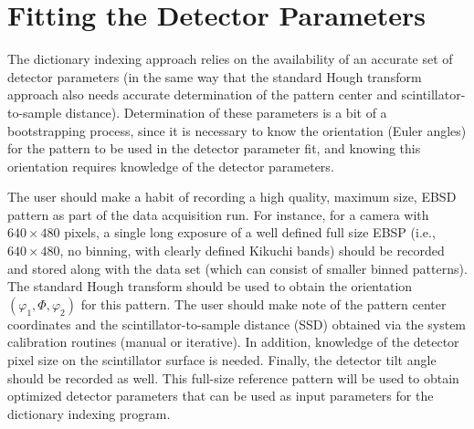 \documentclass[DIV=calc, paper=letter, fontsize=11pt]{scrartcl}	 %
\begin{document}
\section{Fitting the Detector Parameters\label{sec:fit}}
The dictionary indexing approach relies on the availability of an accurate set of detector parameters (in the same way that the 
standard Hough transform approach also needs accurate determination of the pattern center and scintillator-to-sample distance).  
Determination of these parameters is a bit of a bootstrapping process, since it is necessary to know the orientation (Euler angles)
for the pattern to be used in the detector parameter fit, and knowing this orientation requires knowledge of the detector parameters.

The user should make a habit of recording a high quality, maximum size, EBSD pattern as part of the data acquisition run.  For instance,
for a camera with $640\times 480$ pixels, a single long exposure of a well defined full size EBSP (i.e., $640\times 480$, no binning,
with clearly defined Kikuchi bands) should be recorded and stored along with the data set (which can consist of smaller binned patterns).  The standard Hough transform should be 
used to obtain the orientation $(\varphi_1,\Phi,\varphi_2)$ for this pattern.  The user should make note of the pattern center coordinates
and the scintillator-to-sample distance (SSD) obtained via the system calibration routines (manual or iterative).  In addition, knowledge
of the detector pixel size on the scintillator surface is needed.  Finally, the detector tilt angle should be recorded as well.  This full-size reference 
pattern will be used to obtain optimized detector parameters that can be used as input parameters for the dictionary indexing program.
\end{document}
